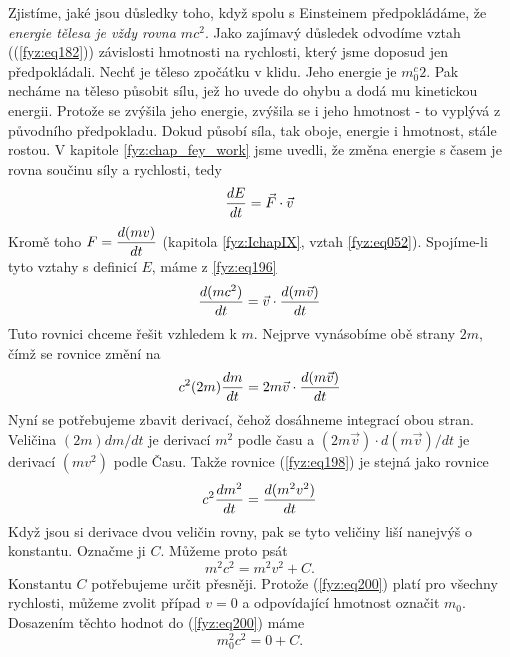     Zjistíme, jaké jsou důsledky toho, když spolu s Einsteinem předpokládáme, že \emph{energie 
    tělesa je vždy rovna \(mc^2\)}. Jako zajímavý důsledek odvodíme vztah ((\ref{fyz:eq182})) 
    závislosti hmotnosti na rychlosti, který jsme doposud jen předpokládali. Nechť je těleso 
    zpočátku v klidu. Jeho energie je \(m_0^c2\). Pak necháme na těleso působit sílu, jež ho uvede 
    do ohybu a dodá mu kinetickou energii. Protože se zvýšila jeho energie, zvýšila se i jeho 
    hmotnost - to vyplývá z původního předpokladu. Dokud působí síla, tak oboje, energie i 
    hmotnost, stále rostou. V kapitole \ref{fyz:chap_fey_work} jsme uvedli, že změna energie s 
    časem je rovna součinu síly a rychlosti, tedy
    \begin{equation}\label{fyz:eq196}
      \dfrac{d E}{d t} = \vec{F}\cdot\vec{v}
    \end{equation}
    Kromě toho \(F=\dfrac{d (mv)}{d t}\) (kapitola \ref{fyz:IchapIX}, vztah \ref{fyz:eq052}). 
    Spojíme-li tyto vztahy s definicí \(E\), máme z \ref{fyz:eq196}
    \begin{equation}\label{fyz:eq197}
      \dfrac{d (mc^2)}{d t} = \vec{v}\cdot\dfrac{d (m\vec{v})}{d t}
    \end{equation}
    Tuto rovnici chceme řešit vzhledem k \(m\). Nejprve vynásobíme obě strany \(2m\), čímž se 
    rovnice změní na
    \begin{equation}\label{fyz:eq198}
      c^2(2m)\dfrac{d m}{d t} = 2m\vec{v}\cdot\dfrac{d (m\vec{v})}{d t}
    \end{equation}
    Nyní se potřebujeme zbavit derivací, čehož dosáhneme integrací obou stran. Veličina \((2m) 
    dm/dt\) je derivací \(m^2\) podle času a \((2m\vec{v})\cdot d(m\vec{v})/dt\) je derivací 
    \((mv^2)\) podle Času. Takže rovnice (\ref{fyz:eq198}) je stejná jako rovnice 
    \begin{equation}\label{fyz:eq199}
      c^2\dfrac{d m^2}{d t} = \dfrac{d (m^2v^2)}{d t}
    \end{equation}
    Když jsou si derivace dvou veličin rovny, pak se tyto veličiny liší nanejvýš o konstantu. 
    Označme ji \(C\). Můžeme proto psát
    \begin{equation}\label{fyz:eq200}
      m^2c^2 = m^2v^2 + C.
    \end{equation}
    Konstantu \(C\) potřebujeme určit přesněji. Protože (\ref{fyz:eq200}) platí pro všechny 
    rychlosti, můžeme zvolit případ \(v = 0\) a odpovídající hmotnost označit \(m_0\). Dosazením 
    těchto hodnot do (\ref{fyz:eq200}) máme
    \begin{equation}\label{fyz:eq201}
      m_0^2c^2 = 0 + C.
    \end{equation}
